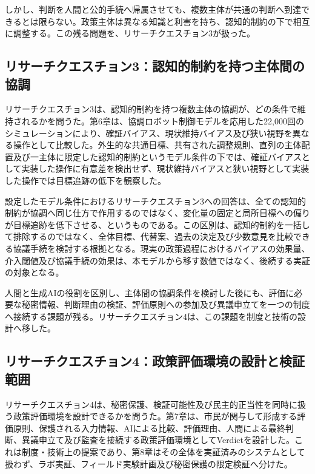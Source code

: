 しかし、判断を人間と公的手続へ帰属させても、複数主体が共通の判断へ到達できるとは限らない。政策主体は異なる知識と利害を持ち、認知的制約の下で相互に調整する。この残る問題を、リサーチクエスチョン3が扱った。

\subsection{リサーチクエスチョン3：認知的制約を持つ主体間の協調}

リサーチクエスチョン3は、認知的制約を持つ複数主体の協調が、どの条件で維持されるかを問うた。第6章は、協調ロボット制御モデルを応用した22,000回のシミュレーションにより、確証バイアス、現状維持バイアス及び狭い視野を異なる操作として比較した。外生的な共通目標、共有された調整規則、直列の主体配置及び一主体に限定した認知的制約というモデル条件の下では、確証バイアスとして実装した操作に有意差を検出せず、現状維持バイアスと狭い視野として実装した操作では目標追跡の低下を観察した。

設定したモデル条件におけるリサーチクエスチョン3への回答は、全ての認知的制約が協調へ同じ仕方で作用するのではなく、変化量の固定と局所目標への偏りが目標追跡を低下させる、というものである。この区別は、認知的制約を一括して排除するのではなく、全体目標、代替案、過去の決定及び少数意見を比較できる協議手続を検討する根拠となる。現実の政策過程におけるバイアスの効果量、介入閾値及び協議手続の効果は、本モデルから移す数値ではなく、後続する実証の対象となる。

人間と生成AIの役割を区別し、主体間の協調条件を検討した後にも、評価に必要な秘密情報、判断理由の検証、評価原則への参加及び異議申立てを一つの制度へ接続する課題が残る。リサーチクエスチョン4は、この課題を制度と技術の設計へ移した。

\subsection{リサーチクエスチョン4：政策評価環境の設計と検証範囲}

リサーチクエスチョン4は、秘密保護、検証可能性及び民主的正当性を同時に扱う政策評価環境を設計できるかを問うた。第7章は、市民が関与して形成する評価原則、保護される入力情報、AIによる比較、評価理由、人間による最終判断、異議申立て及び監査を接続する政策評価環境としてVerdictを設計した。これは制度・技術上の提案であり、第8章はその全体を実証済みのシステムとして扱わず、ラボ実証、フィールド実験計画及び秘密保護の限定検証へ分けた。

